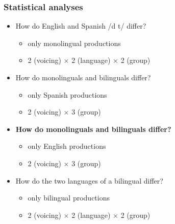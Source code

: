 \documentclass{beamer}
\begin{document}
\begin{frame}
\frametitle{Statistical analyses}
\begin{itemize}
	\item How do English and Spanish /d t/ differ?
	\begin{itemize}
		\item only monolingual productions
		\item 2 (voicing) $\times$ 2 (language) $\times$ 2 (group)
	\end{itemize}
	\item How do monolinguals and bilinguals differ?
	\begin{itemize}
		\item only Spanish productions
		\item 2 (voicing) $\times$ 3 (group)
	\end{itemize}
	\item \textbf{How do monolinguals and bilinguals differ?}
	\begin{itemize}
		\item only English productions
		\item 2 (voicing) $\times$ 3 (group)
	\end{itemize}
	\item How do the two languages of a bilingual differ?
	\begin{itemize}
		\item only bilingual productions
		\item 2 (voicing) $\times$ 2 (language) $\times$ 2 (group)
	\end{itemize}
\end{itemize}
\end{frame}
\end{document}
